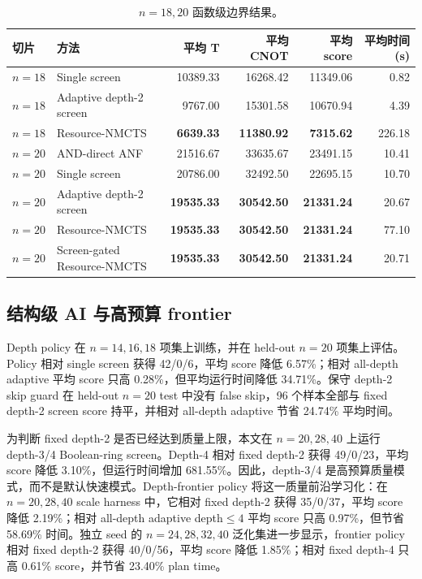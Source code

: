 \documentclass[UTF8,fontset=macnew,11pt]{ctexart}
\newcommand{\method}{Resource-NMCTS}
\newcommand{\screen}{Boolean-ring screen}
\begin{document}
\begin{table}[H]
\centering
\scriptsize
\caption{$n=18,20$ 函数级边界结果。}
\label{tab:highdim}
\begin{tabular}{llrrrr}
\toprule
切片 & 方法 & 平均 T & 平均 CNOT & 平均 score & 平均时间(s) \\
\midrule
$n=18$ & Single screen & 10389.33 & 16268.42 & 11349.06 & 0.82 \\
$n=18$ & Adaptive depth-2 screen & 9767.00 & 15301.58 & 10670.94 & 4.39 \\
$n=18$ & \method{} & \textbf{6639.33} & \textbf{11380.92} & \textbf{7315.62} & 226.18 \\
$n=20$ & AND-direct ANF & 21516.67 & 33635.67 & 23491.15 & 10.41 \\
$n=20$ & Single screen & 20786.00 & 32492.50 & 22695.15 & 10.70 \\
$n=20$ & Adaptive depth-2 screen & \textbf{19535.33} & \textbf{30542.50} & \textbf{21331.24} & 20.67 \\
$n=20$ & \method{} & \textbf{19535.33} & \textbf{30542.50} & \textbf{21331.24} & 77.10 \\
$n=20$ & Screen-gated \method{} & \textbf{19535.33} & \textbf{30542.50} & \textbf{21331.24} & 20.71 \\
\bottomrule
\end{tabular}
\end{table}

\subsection{结构级 AI 与高预算 frontier}

Depth policy 在 $n=14,16,18$ 项集上训练，并在 held-out $n=20$ 项集上评估。Policy 相对 single screen 获得 42/0/6，平均 score 降低 6.57\%；相对 all-depth adaptive 平均 score 只高 0.28\%，但平均运行时间降低 34.71\%。保守 depth-2 skip guard 在 held-out $n=20$ test 中没有 false skip，96 个样本全部与 fixed depth-2 screen score 持平，并相对 all-depth adaptive 节省 24.74\% 平均时间。

为判断 fixed depth-2 是否已经达到质量上限，本文在 $n=20,28,40$ 上运行 depth-3/4 \screen{}。Depth-4 相对 fixed depth-2 获得 49/0/23，平均 score 降低 3.10\%，但运行时间增加 681.55\%。因此，depth-3/4 是高预算质量模式，而不是默认快速模式。Depth-frontier policy 将这一质量前沿学习化：在 $n=20,28,40$ scale harness 中，它相对 fixed depth-2 获得 35/0/37，平均 score 降低 2.19\%；相对 all-depth adaptive depth$\leq4$ 平均 score 只高 0.97\%，但节省 58.69\% 时间。独立 seed 的 $n=24,28,32,40$ 泛化集进一步显示，frontier policy 相对 fixed depth-2 获得 40/0/56，平均 score 降低 1.85\%；相对 fixed depth-4 只高 0.61\% score，并节省 23.40\% plan time。
\end{document}
